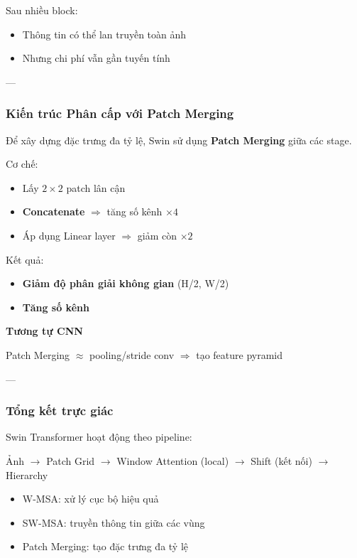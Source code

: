 Sau nhiều block:
\begin{itemize}
	\item Thông tin có thể lan truyền toàn ảnh
	\item Nhưng chi phí vẫn gần tuyến tính
\end{itemize}

---

\subsubsection{Kiến trúc Phân cấp với Patch Merging}
\label{subsubsec:swin_hierarchical}

Để xây dựng đặc trưng đa tỷ lệ, Swin sử dụng \textbf{Patch Merging} giữa các stage.

Cơ chế:

\begin{itemize}
	\item Lấy $2 \times 2$ patch lân cận
	\item \textbf{Concatenate} $\Rightarrow$ tăng số kênh $\times 4$
	\item Áp dụng Linear layer $\Rightarrow$ giảm còn $\times 2$
\end{itemize}

Kết quả:
\begin{itemize}
	\item \textbf{Giảm độ phân giải không gian} (H/2, W/2)
	\item \textbf{Tăng số kênh}
\end{itemize}

\begin{mdframed}[style=infobox]
	\textbf{Tương tự CNN}
	
	Patch Merging $\approx$ pooling/stride conv  
	$\Rightarrow$ tạo feature pyramid
\end{mdframed}

---

\subsubsection{Tổng kết trực giác}

Swin Transformer hoạt động theo pipeline:

\begin{center}
	Ảnh $\rightarrow$ Patch Grid $\rightarrow$ Window Attention (local) $\rightarrow$ Shift (kết nối) $\rightarrow$ Hierarchy
\end{center}

\begin{itemize}
	\item W-MSA: xử lý cục bộ hiệu quả
	\item SW-MSA: truyền thông tin giữa các vùng
	\item Patch Merging: tạo đặc trưng đa tỷ lệ
\end{itemize}

